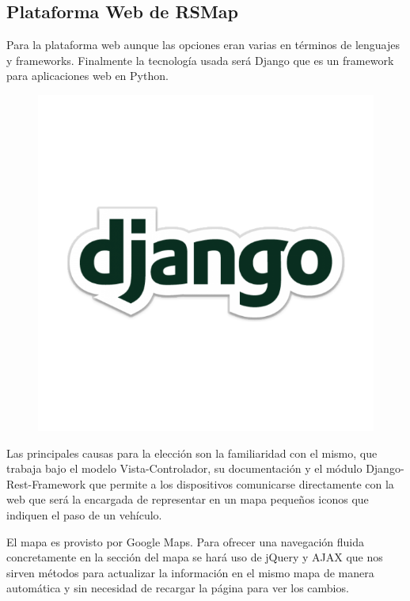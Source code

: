 \subsection{Plataforma Web de RSMap}

Para la plataforma web aunque las opciones eran varias en términos de lenguajes y frameworks. Finalmente la tecnología usada será Django que es un framework para aplicaciones web en Python.

\begin{figure}[!ht]
  \begin{center}
    \includegraphics[scale=0.1]{../images/web/django-logo.png}
    \label{fig:drflog}
	\end{center}
\end{figure}

Las principales causas para la elección son la familiaridad con el mismo, que trabaja bajo el modelo Vista-Controlador, su documentación y el módulo Django-Rest-Framework que permite a los dispositivos comunicarse directamente con la web que será la encargada de representar en un mapa pequeños iconos que indiquen el paso de un vehículo.

El mapa es provisto por Google Maps.  Para ofrecer una navegación fluida concretamente en la sección del mapa se hará uso de jQuery y AJAX que nos sirven métodos para actualizar la información en el mismo mapa de manera automática y sin necesidad de recargar la página para ver los cambios.

